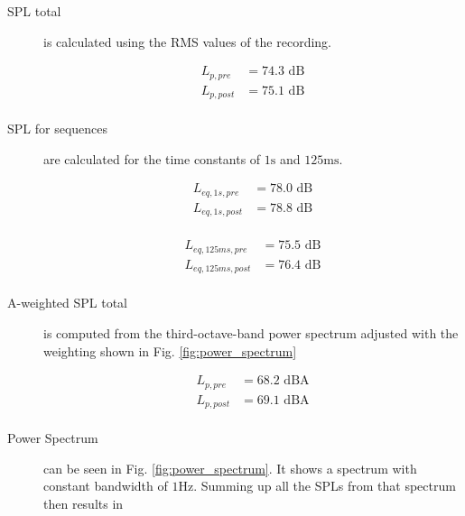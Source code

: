 \documentclass[twocolumn]{article}
\begin{document}
\begin{description}
\item[SPL total] is calculated using the RMS values of the recording.

\begin{equation}
\begin{aligned}
    L_{p,pre} & = 74.3 \textrm{ dB} \\
    L_{p,post} & = 75.1 \textrm{ dB} \\
\end{aligned}
\end{equation}

\item[SPL for sequences] are calculated for the time constants of $1\textrm{s}$ and $125\textrm{ms}$.

\begin{equation}
\begin{aligned}
    L_{eq,1s,pre} & = 78.0 \textrm{ dB} \\
    L_{eq,1s,post} & = 78.8 \textrm{ dB} \\
\end{aligned}
\end{equation}

\begin{equation}
\begin{aligned}
    L_{eq,125ms,pre} & = 75.5 \textrm{ dB} \\
    L_{eq,125ms,post} & = 76.4 \textrm{ dB} \\
\end{aligned}
\end{equation}

\item[A-weighted SPL total] is computed from the third-octave-band power spectrum adjusted with the weighting
    shown in Fig. \ref{fig:power_spectrum}

\begin{equation}
\begin{aligned}
    L_{p,pre} & = 68.2 \textrm{ dBA} \\
    L_{p,post} & = 69.1 \textrm{ dBA} \\
\end{aligned}
\end{equation}

\item[Power Spectrum] can be seen in Fig. \ref{fig:power_spectrum}.
    It shows a spectrum with constant bandwidth of $1\textrm{Hz}$.
    Summing up all the SPLs from that spectrum then results in


\end{description}
\end{document}
